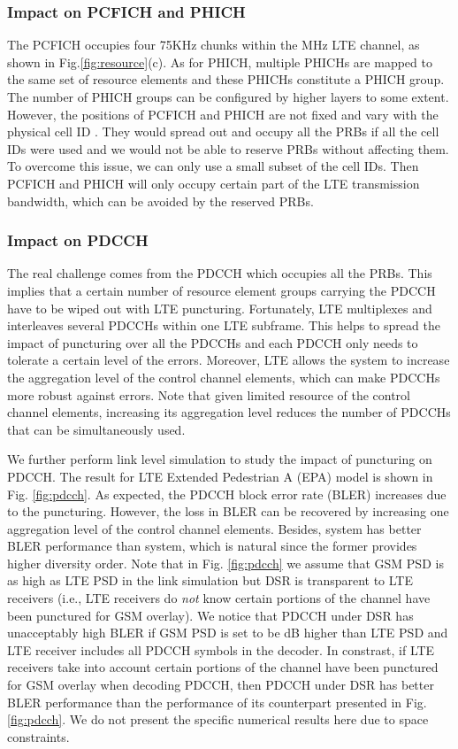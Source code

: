 \documentclass[10pt,journal]{IEEEtran}
\theoremstyle{slplain}
\begin{document}
 \subsubsection{Impact on PCFICH and PHICH}
 The PCFICH occupies four 75KHz chunks within the MHz LTE channel, as shown in Fig.\ref{fig:resource}(c). As for PHICH, multiple PHICHs are mapped to the same set of resource elements and these PHICHs constitute a PHICH group. The number of PHICH groups can be configured by higher layers to some extent. However, the positions of PCFICH and PHICH are not fixed and vary with the physical cell ID \cite{3gppMobility}. They would spread out and occupy all the PRBs  if all the cell IDs were used and we would not be able to reserve PRBs without affecting them. To overcome this issue, we can only use a small subset of the cell IDs. Then PCFICH and PHICH will only occupy certain part of the LTE transmission bandwidth, which can be avoided by the reserved PRBs.


  \subsubsection{Impact on PDCCH}
 The real challenge comes from the PDCCH which occupies all the PRBs. This implies that a certain number of resource element groups carrying the PDCCH have to be wiped out with LTE puncturing. Fortunately, LTE multiplexes and interleaves several PDCCHs within one LTE subframe. This helps to spread the impact of puncturing over all the PDCCHs and each PDCCH only needs to tolerate a certain level of the errors. Moreover, LTE allows the system to increase the aggregation level of the control channel elements, which can make PDCCHs more robust against errors.  Note that given limited resource of the control channel elements, increasing its aggregation level reduces the number of PDCCHs that can be simultaneously used.


We further perform link level simulation to study the impact of puncturing on PDCCH. The result for LTE Extended Pedestrian A (EPA) model is shown in Fig. \ref{fig:pdcch}. As expected, the PDCCH block error rate (BLER) increases due to the puncturing. However, the loss in BLER can be recovered by increasing one aggregation level of the control channel elements. Besides,  system has better BLER performance than  system, which is natural since the former provides higher diversity order. Note that in Fig. \ref{fig:pdcch} we assume that GSM PSD is   as high as LTE PSD in the link simulation but DSR is transparent to LTE receivers (i.e., LTE receivers do \textit{not} know certain portions of the channel have been punctured for GSM overlay). We notice that PDCCH under DSR has unacceptably high BLER if  GSM PSD is set to be dB higher than LTE PSD and LTE receiver includes all PDCCH symbols in the decoder. In constrast, if LTE receivers take into account certain portions of the channel have been punctured for GSM overlay when decoding  PDCCH, then PDCCH under DSR has better BLER performance than the performance of its counterpart presented in Fig. \ref{fig:pdcch}. We do not present the specific numerical results here due to space constraints. 
\end{document}
